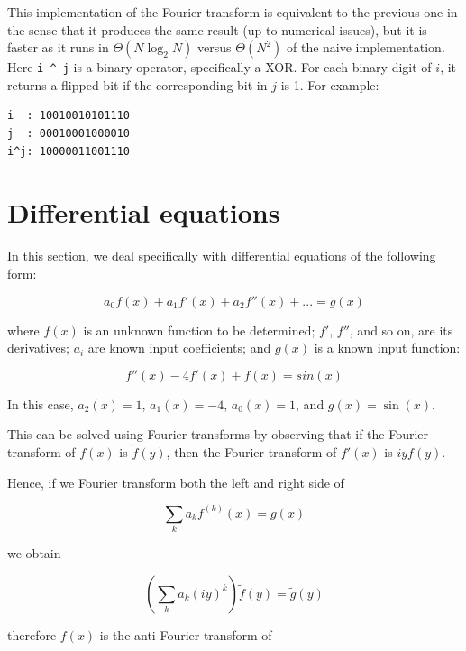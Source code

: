 \documentclass[justified, sixbynine]{tufte-book}
\theoremstyle{plain}%
\newtheorem * {corollary}{Corollary}
\theoremstyle{definition}
\theoremstyle{remark}
\newtheorem * {remark}{Remark}
\newtheorem * {note}{Note}
\begin{document}
\begin{fullwidth}
This implementation of the Fourier transform is equivalent to the previous one in the sense that it produces the same result (up to numerical issues), but it is faster as it runs in $\Theta(N \log_2 N)$ versus $\Theta(N^2)$ of the naive implementation. Here \verb!i ^ j!
is a binary operator, specifically a XOR. For each binary digit of $i$, it returns a flipped bit if the corresponding bit in $j$ is 1. For example:

\begin{lstlisting}
i  : 10010010101110
j  : 00010001000010
i^j: 10000011001110
\end{lstlisting}

\section{Differential equations}

In this section, we deal specifically with differential equations of the following form:

\begin{equation}
a_0 f(x) + a_1 f'(x) + a_2 f''(x) + ... = g(x) \label{diffeq}
\end{equation}

where $f(x)$ is an unknown function to be determined; $f'$, $f''$, and so on, are its derivatives; $a_i$ are known input coefficients; and $g(x)$ is a known input function:

\begin{equation}
f''(x) - 4 f'(x) + f(x) = sin(x)
\end{equation}

In this case, $a_2(x) = 1$, $a_1(x) = -4$, $a_0(x) = 1$, and $g(x) = \sin(x)$.

This can be solved using Fourier transforms by observing that if the Fourier transform of $f(x)$ is $\tilde f(y)$, then the Fourier transform of $f'(x)$ is $iy\tilde f(y)$.

Hence, if we Fourier transform both the left and right side of

\begin{equation}
\sum _k a_k f^{(k)}(x) = g(x)
\end{equation}

we obtain

\begin{equation}
(\sum _k a_k (i y)^k) \tilde f(y) = \tilde g(y)
\end{equation}

therefore $f(x)$ is the anti-Fourier transform of


\end{fullwidth}
\end{document}
